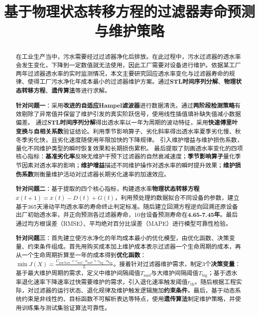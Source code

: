\documentclass[withoutpreface,bwprint]{cumcmthesis}
\title{基于物理状态转移方程的过滤器寿命预测与维护策略}  %
\begin{document}
\maketitle
\begin{abstract}

在工业生产当中，污水需要经过过滤器净化后排放。在此过程中，污水过滤器的透水率会发生变化，下降到一定数值就无法使用，因此工厂需要对设备进行维护。依据某工厂两年过滤器透水率的实时监测情况，本文主要研究回应透水率变化与过滤器寿命的规律、使得工厂污水净化年成本最小的过滤器维护方案。通过\textbf{STL时间序列分解}、\textbf{物理状态转移方程}、\textbf{遗传算法}等进行求解。

\textbf{针对问题一}：采用\textbf{改进的自适应Hampel滤波器}进行数据清洗，通过\textbf{两阶段检测策略}有效剔除了异常值并保留了维护引发的真实阶跃信号，使用线性插值填补缺失值减小数据偏差。
通过\textbf{STL时间序列分解}得出透水率以一年为周期的波动特征，采用\textbf{快速傅里叶变换}与\textbf{自相关系数}验证结论。利用季节影响算子、劣化斜率得出透水率夏季劣化慢、秋冬季劣化快，且劣化速度随使用年限加快的下降规律。
引入维护增益与维护损伤系数，量化不同维护类型的瞬时恢复效果和长期损伤累积。
最后提取了刻画透水率变化的四项核心指标：\textbf{基准劣化率}反映无维护干预下过滤器的自然衰减速度；\textbf{季节影响算子}量化季节因素对透水率的影响；\textbf{维护增益}描述不同维护操作对透水率的瞬时提升效果；\textbf{维护损伤系数}则衡量维护活动对过滤器长期劣化速率的加速效应。

\textbf{针对问题二}：基于提取的四个核心指标，构建透水率\textbf{物理状态转移方程\(x(t+1) = x(t) - D(t) + G(t)\)}，利用预处理的数据拟合不同设备的参数，建立基于365天滑动平均透水率的寿命终止判定标准。随后建立回溯方程逆向回溯还原设备出厂初始透水率，并正向预测各过滤器寿命，10台设备预测寿命在\textbf{4.65-7.45年}。最后通过均方根误差（RMSE）、平均绝对百分比误差（MAPE）进行模型可靠性检验。



\textbf{针对问题三}：首先建立使污水净化的年均成本最小的优化模型，由优化函数、决策变量、约束条件组成。首先用购买成本加上维护成本表示过滤器一个生命周期的成本，再从一个生命周期折算至一年的成本得到\textbf{优化函数}：\textbf{\(\min J(X) = \frac{C_{\text{purchase}} + c_{\text{mid}} \cdot n_{\text{mid}} + c_{\text{big}} \cdot n_{\text{big}}}{L}\)}。接着针对过滤器维护需求，制定3个\textbf{决策变量}：基于最大维护周期的需求，定义中维护间隔阈值$T_{\text{mid}}$与大维护间隔阈值$T_{\text{big}}$；基于透水率退化速率下降速率过快需要维护的需求，引入退化速率触发阈值$r_{\text{th}}$。随后根据工程实际，对过滤器的运行状态、退化规律及维护触发逻辑施加\textbf{约束条件}。最后，基于动态系统约束是非线性的、目标函数不可解析表达等特点，使用\textbf{遗传算法}制定维护策略，并使用训练集与测试集验证算法可靠性。


\end{abstract}
\end{document}
